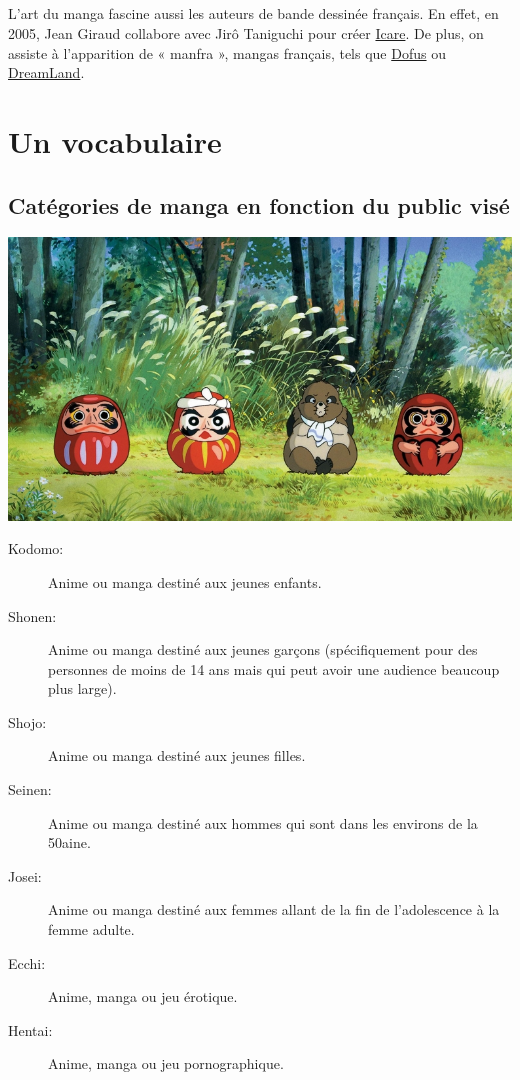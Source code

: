 \paragraph{} L’art du manga fascine aussi les auteurs de bande dessinée
français. En effet, en 2005, Jean Giraud collabore avec Jirô Taniguchi pour
créer \underline{Icare}. De plus, on assiste à l’apparition de « manfra »,
mangas français, tels que \underline{Dofus} ou \underline{DreamLand}.

\chapter{Un vocabulaire}

\section{Catégories de manga en fonction du public visé}

\begin{center}
	\includegraphics[scale=0.5]{Kodomo.jpg}
\end{center}

\begin{description}
	\item[Kodomo:] Anime ou manga destiné aux jeunes enfants.
	\item[Shonen:] Anime ou manga destiné aux jeunes garçons (spécifiquement
		pour des personnes de moins de 14 ans mais qui peut avoir une audience
		beaucoup plus large).
	\item[Shojo:] Anime ou manga destiné aux jeunes filles.
	\item[Seinen:] Anime ou manga destiné aux hommes qui sont dans les environs
		de la 50aine.
	\item[Josei:] Anime ou manga destiné aux femmes allant de la fin de
		l'adolescence à la femme adulte.
	\item[Ecchi:] Anime, manga ou jeu érotique.
	\item[Hentai:] Anime, manga ou jeu pornographique.
\end{description}

